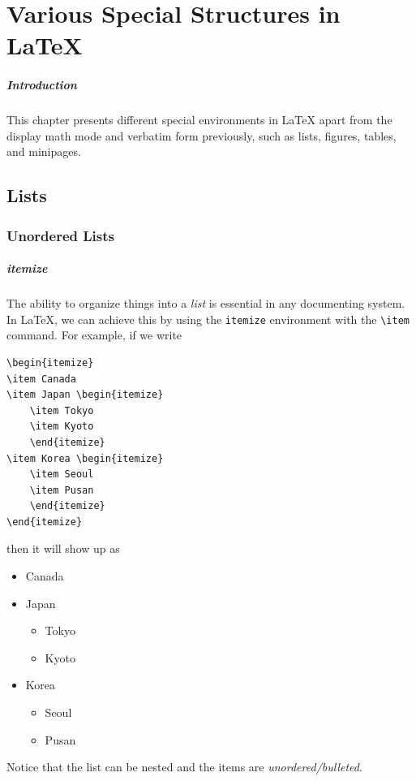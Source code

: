 \chapter{Various Special Structures in \LaTeX{}}

\paragraph{Introduction}
This chapter presents different special environments in \LaTeX{} apart from the display math mode and verbatim form previously, such as lists, figures, tables, and minipages.

\section{Lists}

\subsection{Unordered Lists}

\paragraph{itemize}
The ability to organize things into a \textit{list} is essential in any documenting system. In \LaTeX{}, we can achieve this by using the \verb|itemize| environment with the \texttt{\textbackslash item} command. For example, if we write
\begin{lstlisting}
\begin{itemize}
\item Canada
\item Japan \begin{itemize}
    \item Tokyo
    \item Kyoto
    \end{itemize}
\item Korea \begin{itemize}
    \item Seoul
    \item Pusan
    \end{itemize}
\end{itemize}  
\end{lstlisting}
then it will show up as
\begin{itemize}
\item Canada
\item Japan \begin{itemize}
    \item Tokyo
    \item Kyoto
    \end{itemize}
\item Korea \begin{itemize}
    \item Seoul
    \item Pusan
    \end{itemize}
\end{itemize}  
Notice that the list can be nested and the items are \textit{unordered/bulleted}.

